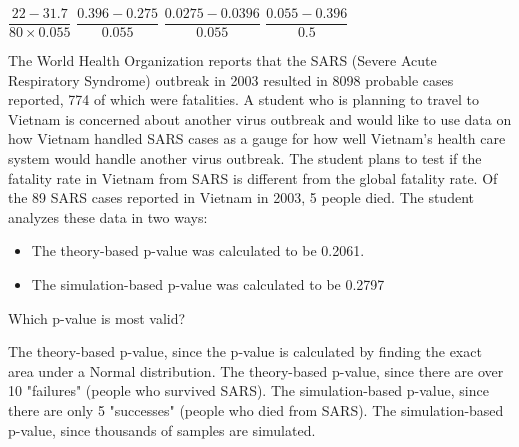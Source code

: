 \documentclass{exam}
\begin{document}
\begin{questions}
		\begin{oneparchoices}
			\choice \(\dfrac{22-31.7}{80\times0.055}\)
			\choice \(\dfrac{0.396-0.275}{0.055}\)
			\correctchoice \(\dfrac{0.0275-0.0396}{0.055}\)
			\choice \(\dfrac{0.055-0.396}{0.5}\)
		\end{oneparchoices}
		
		\question The World Health Organization reports that the SARS (Severe Acute Respiratory Syndrome) outbreak in 2003 resulted in 8098 probable cases reported, 774 of which were fatalities. A student who is planning to travel to Vietnam is concerned about another virus outbreak and would like to use data on how Vietnam handled SARS cases as a gauge for how well Vietnam's health care system would handle another virus outbreak. The student plans to test if the fatality rate in Vietnam from SARS is different from the global fatality rate. Of the 89 SARS cases reported in Vietnam in 2003, 5 people died. The student analyzes these data in two ways:
		\begin{itemize}
			\item[Method 1:]  The theory-based p-value was calculated to be 0.2061.
			\item[Method 2:]  The simulation-based p-value was calculated to be 0.2797
		\end{itemize}
		Which p-value is most valid?
		
		\begin{choices}
			\choice The theory-based p-value, since the p-value is calculated by finding the exact area under a Normal distribution.
			\choice The theory-based p-value, since there are over 10 "failures" (people who survived SARS).
			\correctchoice The simulation-based p-value, since there are only 5 "successes" (people who died from SARS).
			\choice The simulation-based p-value, since thousands of samples are simulated.
		\end{choices}
				
	\end{questions}
\end{document}
